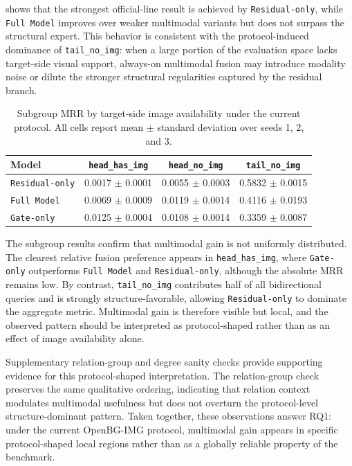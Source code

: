 \documentclass[11pt]{article}
\begin{document}
 shows that the strongest official-line result is achieved by \texttt{Residual-only}, while \texttt{Full Model} improves over weaker multimodal variants but does not surpass the structural expert. This behavior is consistent with the protocol-induced dominance of \texttt{tail\_no\_img}: when a large portion of the evaluation space lacks target-side visual support, always-on multimodal fusion may introduce modality noise or dilute the stronger structural regularities captured by the residual branch.

\begin{table}[H]
\centering
\caption{Subgroup MRR by target-side image availability under the current protocol. All cells report mean $\pm$ standard deviation over seeds 1, 2, and 3.}
\label{tab:subgroup_results}
\small
\setlength{\tabcolsep}{5pt}
\begin{tabular}{lccc}
\toprule
Model & \texttt{head\_has\_img} & \texttt{head\_no\_img} & \texttt{tail\_no\_img} \\
\midrule
\texttt{Residual-only} & 0.0017 $\pm$ 0.0001 & 0.0055 $\pm$ 0.0003 & 0.5832 $\pm$ 0.0015 \\
\texttt{Full Model} & 0.0069 $\pm$ 0.0009 & 0.0119 $\pm$ 0.0014 & 0.4116 $\pm$ 0.0193 \\
\texttt{Gate-only} & 0.0125 $\pm$ 0.0004 & 0.0108 $\pm$ 0.0014 & 0.3359 $\pm$ 0.0087 \\
\bottomrule
\end{tabular}
\end{table}

The subgroup results confirm that multimodal gain is not uniformly distributed. The clearest relative fusion preference appears in \texttt{head\_has\_img}, where \texttt{Gate-only} outperforms \texttt{Full Model} and \texttt{Residual-only}, although the absolute MRR remains low. By contrast, \texttt{tail\_no\_img} contributes half of all bidirectional queries and is strongly structure-favorable, allowing \texttt{Residual-only} to dominate the aggregate metric. Multimodal gain is therefore visible but local, and the observed pattern should be interpreted as protocol-shaped rather than as an effect of image availability alone.

Supplementary relation-group and degree sanity checks provide supporting evidence for this protocol-shaped interpretation. The relation-group check preserves the same qualitative ordering, indicating that relation context modulates multimodal usefulness but does not overturn the protocol-level structure-dominant pattern. Taken together, these observations answer RQ1: under the current OpenBG-IMG protocol, multimodal gain appears in specific protocol-shaped local regions rather than as a globally reliable property of the benchmark.
\end{document}
